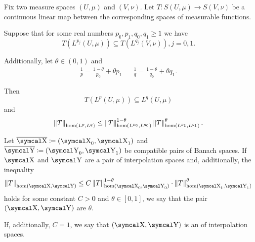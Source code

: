 \begin{theorem}\label{thm:riesz_thorin}
  Fix two measure spaces \( (U, \mu) \) and \( (V, \nu) \). Let \( T: S(U, \mu) \to S(V, \nu) \) be a continuous linear map between the corresponding spaces of measurable functions.

  Suppose that for some real numbers \( p_0, p_1, q_0, q_1 \geq 1 \) we have
  \begin{equation*}
    T(L^{p_j}(U, \mu)) \subseteq T(L^{q_j}(V, \nu)), j = 0, 1.
  \end{equation*}

  Additionally, let \( \theta \in (0, 1) \) and
  \begin{align*}
    \frac 1 p = \frac {1 - \theta} {p_0} + {\theta} {p_1}
    &&
    \frac 1 q = \frac {1 - \theta} {q_0} + {\theta} {q_1}.
  \end{align*}

  Then
  \begin{equation*}
    T(L^p(U, \mu)) \subseteq L^q(U, \mu)
  \end{equation*}
  and
  \begin{equation*}
    \left\Vert T \right\Vert_{\operatorname{hom}(L^p, L^q)} \leq \left\Vert T \right\Vert_{\operatorname{hom}(L^{p_0}, L^{q_0})}^{1 - \theta} \left\Vert T \right\Vert_{\operatorname{hom}(L^{p_1}, L^{q_1})}^\theta.
  \end{equation*}
\end{theorem}

\begin{definition}\label{thm:banach_interpolation_space_exponent}
  Let \( \Ol{\CX} \coloneqq ( \CX_0, \CX_1 ) \) and \( \Ol{\CY} \coloneqq ( \CY_0, \CY_1 ) \) be compatible pairs of Banach spaces. If \( \CX \) and \( \CY \) are a pair of interpolation spaces and, additionally, the inequality
  \begin{equation*}
    \Norm{T}_{\Hom(\CX, \CY)} \leq C \Norm{T}_{\Hom(\CX_0, \CY_0)}^{1-\theta} \cdot \Norm{T}_{\Hom(\CX_1, \CY_1)}^{\theta}
  \end{equation*}
  holds for some constant \( C > 0 \) and \( \theta \in [0, 1] \), we say that the pair \( (\CX, \CY) \) are  \( \theta \).

  If, additionally, \( C = 1 \), we say that \( (\CX, \CY) \) is an  of interpolation spaces.
\end{definition}

